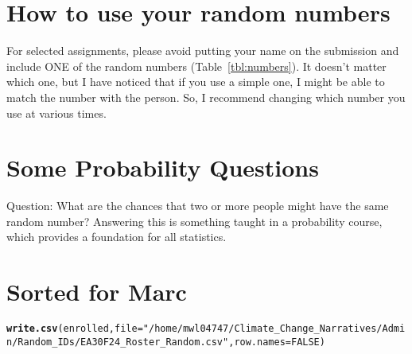 \documentclass{article}\usepackage[]{graphicx}\usepackage[]{xcolor}
\makeatletter
\newcommand{\hlnum}[1]{\textcolor[rgb]{0.686,0.059,0.569}{#1}}%
\newcommand{\hlstr}[1]{\textcolor[rgb]{0.192,0.494,0.8}{#1}}%
\newcommand{\hlstd}[1]{\textcolor[rgb]{0.345,0.345,0.345}{#1}}%
\newcommand{\hlkwc}[1]{\textcolor[rgb]{0.333,0.667,0.333}{#1}}%
\newcommand{\hlkwd}[1]{\textcolor[rgb]{0.737,0.353,0.396}{\textbf{#1}}}%
\newenvironment{kframe}{%
 \def\at@end@of@kframe{}%
 \ifinner\ifhmode%
  \def\at@end@of@kframe{\end{minipage}}%
  \begin{minipage}{\columnwidth}%
 \fi\fi%
 \def\FrameCommand##1{\hskip\@totalleftmargin \hskip-\fboxsep
 \colorbox{shadecolor}{##1}\hskip-\fboxsep
     \hskip-\linewidth \hskip-\@totalleftmargin \hskip\columnwidth}%
 \MakeFramed {\advance\hsize-\width
   \@totalleftmargin\z@ \linewidth\hsize
   \@setminipage}}%
 {\par\unskip\endMakeFramed%
 \at@end@of@kframe}
\newenvironment{knitrout}{}{} %
\makeatother
\begin{document}
\section*{How to use your random numbers}

For selected assignments, please avoid putting your name on the submission and include ONE of the random numbers (Table~\ref{tbl:numbers}). It doesn't matter which one, but I have noticed that if you use a simple one, I might be able to match the number with the person. So, I recommend changing which number you use at various times.

\section*{Some Probability Questions}

Question: What are the chances that two or more people might have the same random number?  Answering this is something taught in a probability course, which provides a foundation for all statistics.

\newpage
\section*{Sorted for Marc}

\begin{knitrout}
\color{fgcolor}\begin{kframe}
\begin{alltt}
\hlkwd{write.csv}\hlstd{(enrolled,} \hlkwc{file}\hlstd{=}\hlstr{"/home/mwl04747/Climate_Change_Narratives/Admin/Random_IDs/EA30F24_Roster_Random.csv"}\hlstd{,} \hlkwc{row.names}\hlstd{=}\hlnum{FALSE}\hlstd{)}
\end{alltt}
\end{kframe}
\end{knitrout}
\end{document}

